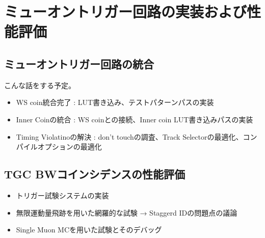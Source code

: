 \chapter{ミューオントリガー回路の実装および性能評価}
\label{chap_SL}

\section{ミューオントリガー回路の統合}
こんな話をする予定。
\begin{itemize}
    \item WS coin統合完了 : LUT書き込み、テストパターンパスの実装
    \item Inner Coinの統合 : WS coinとの接続、Inner coin LUT書き込みパスの実装
    \item Timing Violatinoの解決 : don't touchの調査、Track Selectorの最適化、コンパイルオプションの最適化
\end{itemize}

\section{TGC BWコインシデンスの性能評価}

\begin{itemize}
    \item トリガー試験システムの実装
    \item 無限運動量飛跡を用いた網羅的な試験 → Staggerd IDの問題点の議論
    \item Single Muon MCを用いた試験とそのデバッグ
\end{itemize}

